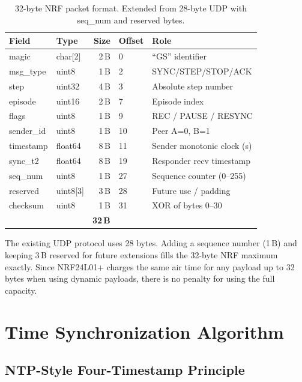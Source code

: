 \documentclass[11pt,a4paper]{article}
\begin{document}
\begin{table}[htbp]
\centering
\caption{32-byte NRF packet format. Extended from 28-byte UDP with seq\_num and reserved bytes.}
\begin{tabular}{l l r l l}
\toprule
\textbf{Field} & \textbf{Type} & \textbf{Size} & \textbf{Offset} & \textbf{Role} \\
\midrule
magic & char[2] & 2\,B & 0 & ``GS'' identifier \\
msg\_type & uint8 & 1\,B & 2 & SYNC/STEP/STOP/ACK \\
step & uint32 & 4\,B & 3 & Absolute step number \\
episode & uint16 & 2\,B & 7 & Episode index \\
flags & uint8 & 1\,B & 9 & REC / PAUSE / RESYNC \\
sender\_id & uint8 & 1\,B & 10 & Peer A=0, B=1 \\
timestamp & float64 & 8\,B & 11 & Sender monotonic clock (s) \\
sync\_t2 & float64 & 8\,B & 19 & Responder recv timestamp \\
seq\_num & uint8 & 1\,B & 27 & Sequence counter (0--255) \\
reserved & uint8[3] & 3\,B & 28 & Future use / padding \\
checksum & uint8 & 1\,B & 31 & XOR of bytes 0--30 \\
\midrule
 & & \textbf{32\,B} & & \\
\bottomrule
\end{tabular}
\label{tab:nrf-packet}
\end{table}

\begin{infobox}
The existing UDP protocol uses 28 bytes. Adding a sequence number (1\,B) and keeping 3\,B reserved for future extensions fills the 32-byte NRF maximum exactly. Since NRF24L01+ charges the same air time for any payload up to 32 bytes when using dynamic payloads, there is no penalty for using the full capacity.
\end{infobox}


\section{Time Synchronization Algorithm}

\subsection{NTP-Style Four-Timestamp Principle}
\end{document}
